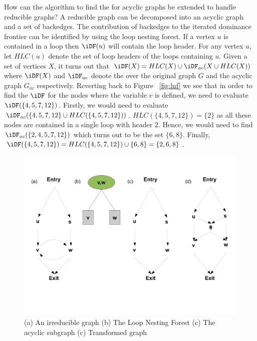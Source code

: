 {    How can the algorithm to find the \iDF for acyclic graphs be extended to handle reducible graphs? 
    A reducible graph can be
    decomposed into an acyclic graph and a set of backedges. The contribution of backedges to the
    iterated dominance frontier can be identified by using the loop nesting forest. If a vertex $u$
    is contained in a loop then $\iDF(u)$ will contain the loop header. For any vertex $u$, let $HLC(u)$
    denote the set of loop headers of the loops containing $u$. Given a set of vertices $X$, it turns
    out that $\iDF(X) = HLC(X) \cup \iDF_{ac}(X \cup HLC(X))$ where $\iDF(X)$ and $\iDF_{ac}$
    denote the \iDF over the original graph $G$ and the acyclic graph $G_{ac}$ respectively. Reverting
    back to Figure ~\ref{fig:lnf} we see that in order to find the $\iDF$ for the nodes where the variable 
    $v$ is defined, we need to evaluate $\iDF(\{4,5,7,12\})$. Firstly, we would need to evaluate 
    $\iDF_{ac}(\{4,5,7,12\} \cup HLC(\{4,5,7,12\}))$. $HLC(\{4,5,7,12\}) = \{2\}$ as all these nodes are contained 
    in a single loop with header $2$. Hence, we would need to find $\iDF_{ac}(\{2,4,5,7,12\})$ which turns
    out to be the set $\{6,8\}$. Finally, $\iDF(\{4,5,7,12\}) = HLC(\{4,5,7,12\}) \cup \{6,8\} = \{2,6,8\}$.
 
    \begin{figure}[htb]
    \centerline{\includegraphics[scale=0.3]{irred.pdf}}
    \caption{(a) An irreducible graph (b) The Loop Nesting Forest (c) The acyclic subgraph (c) Transformed
    graph}
    \label{fig:irred}
    \end{figure} 
 
}
